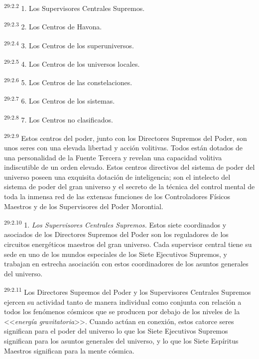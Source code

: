 \par
\textsuperscript{29:2.2} 1. Los Supervisores Centrales Supremos.

\par
\textsuperscript{29:2.3} 2. Los Centros de Havona.

\par
\textsuperscript{29:2.4} 3. Los Centros de los superuniversos.

\par
\textsuperscript{29:2.5} 4. Los Centros de los universos locales.

\par
\textsuperscript{29:2.6} 5. Los Centros de las constelaciones.

\par
\textsuperscript{29:2.7} 6. Los Centros de los sistemas.

\par
\textsuperscript{29:2.8} 7. Los Centros no clasificados.

\par
\textsuperscript{29:2.9} Estos centros del poder, junto con los Directores Supremos del Poder, son unos seres con una elevada libertad y acción volitivas. Todos están dotados de una personalidad de la Fuente Tercera y revelan una capacidad volitiva indiscutible de un orden elevado. Estos centros directivos del sistema de poder del universo poseen una exquisita dotación de inteligencia; son el intelecto del sistema de poder del gran universo y el secreto de la técnica del control mental de toda la inmensa red de las extensas funciones de los Controladores Físicos Maestros y de los Supervisores del Poder Morontial.

\par
\textsuperscript{29:2.10} 1. \textit{Los Supervisores Centrales Supremos.} Estos siete coordinados y asociados de los Directores Supremos del Poder son los reguladores de los circuitos energéticos maestros del gran universo. Cada supervisor central tiene su sede en uno de los mundos especiales de los Siete Ejecutivos Supremos, y trabajan en estrecha asociación con estos coordinadores de los asuntos generales del universo.

\par
\textsuperscript{29:2.11} Los Directores Supremos del Poder y los Supervisores Centrales Supremos ejercen su actividad tanto de manera individual como conjunta con relación a todos los fenómenos cósmicos que se producen por debajo de los niveles de la <<\textit{energía gravitatoria}>>. Cuando actúan en conexión, estos catorce seres significan para el poder del universo lo que los Siete Ejecutivos Supremos significan para los asuntos generales del universo, y lo que los Siete Espíritus Maestros significan para la mente cósmica.

